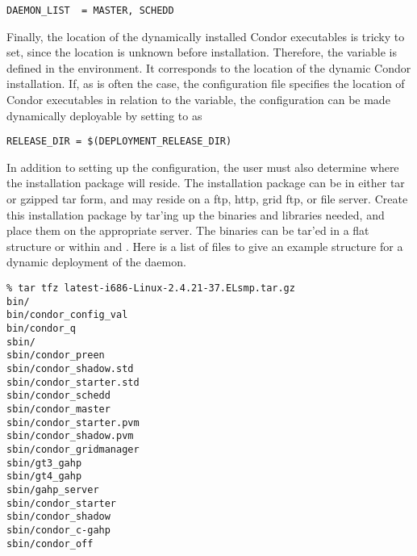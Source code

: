 \footnotesize
\begin{verbatim}
DAEMON_LIST  = MASTER, SCHEDD
\end{verbatim}
\normalsize

Finally, the location
of the dynamically installed Condor executables is tricky to set,
since the location is unknown before installation.
Therefore,
the variable  is defined in the environment.
It corresponds to the location of the dynamic Condor installation.
If, as is often the case, 
the configuration file specifies the location of Condor executables in
relation to the  variable, the configuration can
be made dynamically deployable by setting  to
 as 

\footnotesize
\begin{verbatim}
RELEASE_DIR = $(DEPLOYMENT_RELEASE_DIR)
\end{verbatim}
\normalsize

In addition to setting up the configuration, the user must also
determine where the installation package will reside.
The installation package can be in either tar or 
gzipped tar form, and may
reside on a ftp, http, grid ftp, or file server.  
Create this installation package by tar'ing up the binaries and libraries
needed, and place them on the appropriate server.
The binaries can be tar'ed in a flat structure or within  and
.  Here is a list of files to give an example
structure for a dynamic deployment of the  daemon.

\footnotesize
\begin{verbatim}
% tar tfz latest-i686-Linux-2.4.21-37.ELsmp.tar.gz
bin/
bin/condor_config_val
bin/condor_q
sbin/
sbin/condor_preen
sbin/condor_shadow.std
sbin/condor_starter.std
sbin/condor_schedd
sbin/condor_master
sbin/condor_starter.pvm
sbin/condor_shadow.pvm
sbin/condor_gridmanager
sbin/gt3_gahp
sbin/gt4_gahp
sbin/gahp_server
sbin/condor_starter
sbin/condor_shadow
sbin/condor_c-gahp
sbin/condor_off 
\end{verbatim}
\normalsize

